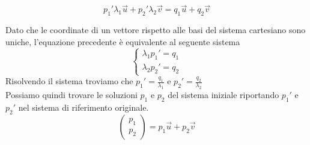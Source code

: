 \documentclass[10pt,a4paper]{article}
\theoremstyle{plain}
\theoremstyle{definition}
\begin{document}
\[
p_1'\lambda_1\vec{u}+p_2'\lambda_2\vec{v}=q_1\vec{u}+q_2\vec{v}
\]

Dato che le coordinate di un vettore rispetto alle basi del sistema cartesiano sono uniche, l'equazione precedente è equivalente al seguente sistema
\[
\begin{cases*}
	\lambda_1p_1'=q_1 \\
	\lambda_2p_2'=q_2	
\end{cases*}
\]
Risolvendo il sistema troviamo che $p_1'=\frac{q_1}{\lambda_1}$ e $p_2'=\frac{q_2}{\lambda_2}$\\
Possiamo quindi trovare le soluzioni $p_1$ e $p_2$ del sistema iniziale riportando $p_1'$ e $p_2'$ nel sistema di riferimento originale.
\[
\begin{pmatrix}
	p_1 \\
	p_2
\end{pmatrix}
=
p_1\vec{u}+p_2\vec{v}
\]
\end{document}
